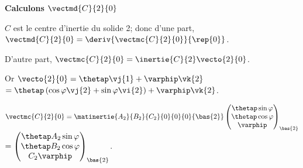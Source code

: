 \begin{corrigebox}
\vspace{.5cm}

\textbf{Calculons $\vectmd{C}{2}{0}$}

$C$ est le centre d'inertie du solide 2; donc 
d'une part, $\vectmd{C}{2}{0} = \deriv{\vectmc{C}{2}{0} }{\rep{0}}$.

 D'autre part, $\vectmc{C}{2}{0} = \inertie{C}{2}\vecto{2}{0}$. 
 
 Or $\vecto{2}{0} = \thetap \vj{1} + \varphip\vk{2}$ $= \thetap \left(\cos\varphi \vj{2} + \sin\varphi \vi{2}\right) + \varphip\vk{2}$.
 
$\vectmc{C}{2}{0} = \matinertie{A_2}{B_2}{C_2}{0}{0}{0}{\bas{2}} 
 \begin{pmatrix} 
 \thetap \sin\varphi  \\
  \thetap \cos\varphi  \\
  \varphip
 \end{pmatrix}_{\bas{2}}$
 $ =  \begin{pmatrix} 
 \thetap A_2 \sin\varphi  \\
  \thetap B_2 \cos\varphi  \\
  C_ 2 \varphip
 \end{pmatrix}_{\bas{2}}$.
\end{corrigebox}
